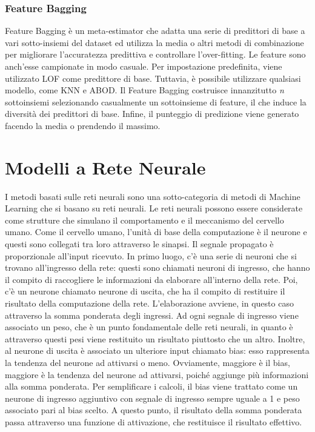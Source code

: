 \subsubsection{Feature Bagging}
Feature Bagging \cite{lazarevic2005feature} è un meta-estimator che adatta una serie di predittori di base a vari sotto-insiemi del dataset ed utilizza la media o altri metodi di combinazione per migliorare l'accuratezza predittiva e controllare l'over-fitting.
Le feature sono anch'esse campionate in modo casuale.
Per impostazione predefinita, viene utilizzato LOF come predittore di base. Tuttavia, è possibile utilizzare qualsiasi modello, come KNN e ABOD.
Il Feature Bagging costruisce innanzitutto \textit{n} sottoinsiemi selezionando casualmente un sottoinsieme di feature, il che induce la diversità dei predittori di base.
Infine, il punteggio di predizione viene generato facendo la media o prendendo il massimo.

\section{Modelli a Rete Neurale}
I metodi basati sulle reti neurali sono una sotto-categoria di metodi di Machine Learning che si basano su reti neurali.
Le reti neurali possono essere considerate come strutture che simulano il comportamento e il meccanismo del cervello umano. Come il cervello umano, l'unità di base della computazione è il neurone e questi sono collegati tra loro attraverso le sinapsi.  Il segnale propagato è proporzionale all'input ricevuto.
In primo luogo, c'è una serie di neuroni che si trovano all'ingresso della rete: questi sono chiamati neuroni di ingresso, che hanno il compito di raccogliere le informazioni da elaborare all'interno della rete.
Poi, c'è un neurone chiamato neurone di uscita, che ha il compito di restituire il risultato della computazione della rete. L'elaborazione avviene, in questo caso attraverso la somma ponderata degli ingressi. 
Ad ogni segnale di ingresso viene associato un peso, che è un punto fondamentale delle reti neurali, in quanto è attraverso questi pesi viene restituito un risultato piuttosto che un altro. Inoltre, al neurone di uscita è associato un ulteriore input chiamato bias: esso rappresenta la tendenza del neurone ad attivarsi o meno. Ovviamente, maggiore è il bias, maggiore è la tendenza del neurone ad attivarsi, poiché aggiunge più informazioni alla somma ponderata. Per semplificare i calcoli, il bias viene trattato come un neurone di ingresso aggiuntivo con segnale di ingresso sempre uguale a 1 e peso associato pari al bias scelto. A questo punto, il risultato della somma ponderata passa attraverso una funzione di attivazione, che restituisce il risultato effettivo.

